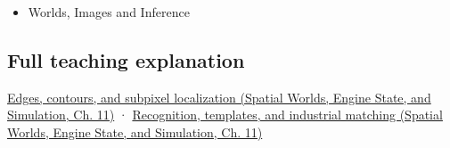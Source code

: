\begin{itemize}
\tightlist
\item
  {Worlds, Images and Inference}
\end{itemize}

\subsection{Full teaching explanation}\label{appendix-a5b0383b3b3e-full-teaching-explanation}

\href{../05-Spatial-Worlds-Engine-State-and-Simulation/main.pdf\#nameddest=04-visual-computing-ii-ch030-edges-contours-and-subpixel-localization}{Edges, contours, and subpixel localization (Spatial Worlds, Engine State, and Simulation, Ch. 11)} · \href{../05-Spatial-Worlds-Engine-State-and-Simulation/main.pdf\#nameddest=04-visual-computing-ii-ch030-recognition-templates-and-industrial-matching}{Recognition, templates, and industrial matching (Spatial Worlds, Engine State, and Simulation, Ch. 11)}
